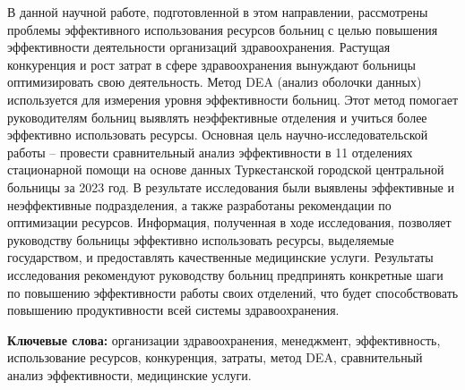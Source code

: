 В данной научной работе, подготовленной в этом направлении, рассмотрены
проблемы эффективного использования ресурсов больниц с целью повышения
эффективности деятельности организаций здравоохранения. Растущая
конкуренция и рост затрат в сфере здравоохранения вынуждают больницы
оптимизировать свою деятельность. Метод DEA (анализ оболочки данных)
используется для измерения уровня эффективности больниц. Этот метод
помогает руководителям больниц выявлять неэффективные отделения и
учиться более эффективно использовать ресурсы. Основная цель
научно-исследовательской работы -- провести сравнительный анализ
эффективности в 11 отделениях стационарной помощи на основе данных
Туркестанской городской центральной больницы за 2023 год. В результате
исследования были выявлены эффективные и неэффективные подразделения, а
также разработаны рекомендации по оптимизации ресурсов. Информация,
полученная в ходе исследования, позволяет руководству больницы
эффективно использовать ресурсы, выделяемые государством, и
предоставлять качественные медицинские услуги. Результаты исследования
рекомендуют руководству больниц предпринять конкретные шаги по повышению
эффективности работы своих отделений, что будет способствовать повышению
продуктивности всей системы здравоохранения.

{\bfseries Ключевые слова:} организации здравоохранения, менеджмент,
эффективность, использование ресурсов, конкуренция, затраты, метод DEA,
сравнительный анализ эффективности, медицинские услуги.

